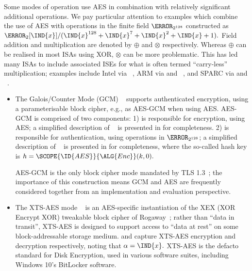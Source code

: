 Some modes of operation use AES in combination with relatively
  significant 
additional operations.  
We pay particular attention to examples which combine the use of AES with
operations in the finite field $\F_{2^{128}}$ constructed as
$
\F_{2}[\IND{x}] / ( \IND{x}^{128} + \IND{x}^{7} + \IND{x}^{2} + \IND{x} + 1 ) .
$
Field 
      addition
and
multiplication
are denoted by
$\oplus$
and
$\otimes$
respectively.
Whereas $\oplus$ can be realised in most ISAs using XOR, $\otimes$ can be
more problematic.  This has led many ISAs to include associated ISEs for
what is often termed ``carry-less'' multiplication; 
examples include
Intel via ~\cite[Page 4-241]{X86:2:18},
ARM   via  and ~\cite[Section C7.2.215]{ARMv8-A:20},
and
SPARC via  and ~\cite[Section 7.143]{SPARC:16}.

\begin{itemize}
\item The Galois/Counter Mode (GCM)
      ~\cite{NIST:sp.800.38d}
      supports authenticated encryption, using a parameterisable block cipher,
      e.g., as AES-GCM when using AES.
      AES-GCM is comprised of two components:
      1)    
            is responsible for 
                encryption,
            using AES; 
            a simplified description of
            ~\cite[Algorithm 3]{NIST:sp.800.38d}
            is presented in
            for completeness.
      2)    
            is responsible for
            authentication,
            using operations in $\F_{2^{128}}$;
            a simplified description of
            ~\cite[Algorithm 2]{NIST:sp.800.38d}
            is presented in
            for completeness,
            where the so-called hash key is
            $
            h = \SCOPE{\ID{AES}}{\ALG{Enc}}( k, 0 ) .
            $

        AES-GCM is the only block cipher mode
        mandated by TLS 1.3~\cite[Section 9.1]{rfc:8446};
        the importance of this construction means
        GCM and AES are frequently considered together
        from an
        implementation and evaluation perspective.
\item The XTS-AES mode 
      ~\cite{NIST:sp.800.38e}
      is an AES-specific instantiation of the XEX (XOR Encrypt XOR) tweakable
      block cipher of Rogaway~\cite{Rogaway:04};
      rather than ``data in transit'', XTS-AES is designed to support access
      to ``data at rest'' on some block-addressable storage medium.
      and
      capture XTS-AES encryption and decryption respectively, noting that 
      $
      \alpha = \IND{x} .
      $
      XTS-AES is the defacto standard for Disk Encryption, used in
      various software suites, including Windows 10's BitLocker software.
\end{itemize}

